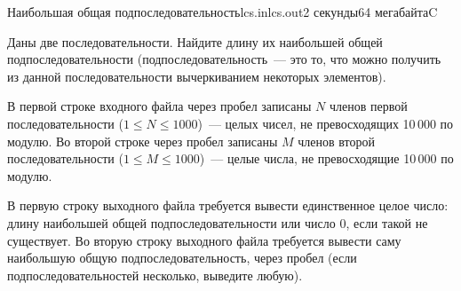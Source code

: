 \documentclass[12pt,a4paper,oneside,twocolumn,landscape]{article}
\begin{document}
\bigskip\bigskip
\begin{problem}{Наибольшая общая подпоследовательность}{lcs.in}{lcs.out}{2 секунды}{64 мегабайта}{C}
\graphicspath{{../largest-common-subsequence/statements/}}


Даны две последовательности. Найдите длину их наибольшей общей подпоследовательности (подпоследовательность~--- это то, что можно получить из данной последовательности вычеркиванием некоторых элементов).

\InputFile
В первой строке входного файла через пробел записаны $N$ членов первой последовательности ($1 \leqslant N \leqslant 1000$)~---
 целых чисел, не превосходящих 10\,000 по модулю.
Во второй строке через пробел записаны $M$ членов второй последовательности ($1 \leqslant M \leqslant 1000$)~--- 
целые числа, не превосходящие 10\,000 по модулю.

\OutputFile
В первую строку выходного файла требуется вывести единственное целое число: длину наибольшей общей подпоследовательности или число 0, если такой не существует.
Во вторую строку выходного файла требуется вывести саму наибольшую общую подпоследовательность, 
через пробел (если подпоследовательностей несколько, выведите любую).


\Example

\begin{example}
%
\end{example}


\end{problem}
\end{document}
